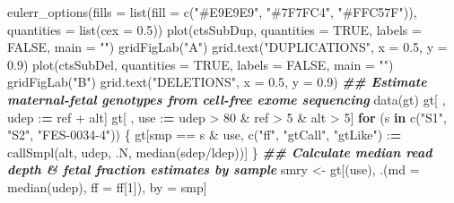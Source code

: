 \documentclass[11pt,letterpaper,oneside]{book}
\newenvironment{Shaded}{\begin{snugshade}}{\end{snugshade}}
\newcommand{\AttributeTok}[1]{\textcolor[rgb]{0.77,0.63,0.00}{#1}}
\newcommand{\ConstantTok}[1]{\textcolor[rgb]{0.00,0.00,0.00}{#1}}
\newcommand{\ControlFlowTok}[1]{\textcolor[rgb]{0.13,0.29,0.53}{\textbf{#1}}}
\newcommand{\DecValTok}[1]{\textcolor[rgb]{0.00,0.00,0.81}{#1}}
\newcommand{\DocumentationTok}[1]{\textcolor[rgb]{0.56,0.35,0.01}{\textbf{\textit{#1}}}}
\newcommand{\ErrorTok}[1]{\textcolor[rgb]{0.64,0.00,0.00}{\textbf{#1}}}
\newcommand{\FloatTok}[1]{\textcolor[rgb]{0.00,0.00,0.81}{#1}}
\newcommand{\FunctionTok}[1]{\textcolor[rgb]{0.00,0.00,0.00}{#1}}
\newcommand{\NormalTok}[1]{#1}
\newcommand{\OtherTok}[1]{\textcolor[rgb]{0.56,0.35,0.01}{#1}}
\newcommand{\SpecialCharTok}[1]{\textcolor[rgb]{0.00,0.00,0.00}{#1}}
\newcommand{\StringTok}[1]{\textcolor[rgb]{0.31,0.60,0.02}{#1}}
\begin{document}
\begin{Shaded}
\begin{Highlighting}[]
\FunctionTok{eulerr\_options}\NormalTok{(}\AttributeTok{fills =} \FunctionTok{list}\NormalTok{(}\AttributeTok{fill =} \FunctionTok{c}\NormalTok{(}\StringTok{"\#E9E9E9"}\NormalTok{, }\StringTok{"\#7F7FC4"}\NormalTok{, }\StringTok{"\#FFC57F"}\NormalTok{)),}
               \AttributeTok{quantities =} \FunctionTok{list}\NormalTok{(}\AttributeTok{cex =} \FloatTok{0.5}\NormalTok{))}
\FunctionTok{plot}\NormalTok{(ctsSubDup, }\AttributeTok{quantities =} \ConstantTok{TRUE}\NormalTok{, }\AttributeTok{labels =} \ConstantTok{FALSE}\NormalTok{, }\AttributeTok{main =} \StringTok{""}\NormalTok{)}
\FunctionTok{gridFigLab}\NormalTok{(}\StringTok{"A"}\NormalTok{)}
\FunctionTok{grid.text}\NormalTok{(}\StringTok{"DUPLICATIONS"}\NormalTok{, }\AttributeTok{x =} \FloatTok{0.5}\NormalTok{, }\AttributeTok{y =} \FloatTok{0.9}\NormalTok{)}
\FunctionTok{plot}\NormalTok{(ctsSubDel, }\AttributeTok{quantities =} \ConstantTok{TRUE}\NormalTok{, }\AttributeTok{labels =} \ConstantTok{FALSE}\NormalTok{, }\AttributeTok{main =} \StringTok{""}\NormalTok{)}
\FunctionTok{gridFigLab}\NormalTok{(}\StringTok{"B"}\NormalTok{)}
\FunctionTok{grid.text}\NormalTok{(}\StringTok{"DELETIONS"}\NormalTok{, }\AttributeTok{x =} \FloatTok{0.5}\NormalTok{, }\AttributeTok{y =} \FloatTok{0.9}\NormalTok{)}
\DocumentationTok{\#\# Estimate maternal{-}fetal genotypes from cell{-}free exome sequencing}
\FunctionTok{data}\NormalTok{(gt)}
\NormalTok{gt[ , udep }\SpecialCharTok{:}\ErrorTok{=}\NormalTok{ ref }\SpecialCharTok{+}\NormalTok{ alt]}
\NormalTok{gt[ , use }\SpecialCharTok{:}\ErrorTok{=}\NormalTok{ udep }\SpecialCharTok{\textgreater{}} \DecValTok{80} \SpecialCharTok{\&}\NormalTok{ ref }\SpecialCharTok{\textgreater{}} \DecValTok{5} \SpecialCharTok{\&}\NormalTok{ alt }\SpecialCharTok{\textgreater{}} \DecValTok{5}\NormalTok{]}
\ControlFlowTok{for}\NormalTok{ (s }\ControlFlowTok{in} \FunctionTok{c}\NormalTok{(}\StringTok{"S1"}\NormalTok{, }\StringTok{"S2"}\NormalTok{, }\StringTok{"FES{-}0034{-}4"}\NormalTok{)) \{}
\NormalTok{  gt[smp }\SpecialCharTok{==}\NormalTok{ s }\SpecialCharTok{\&}\NormalTok{ use,}
     \FunctionTok{c}\NormalTok{(}\StringTok{"ff"}\NormalTok{, }\StringTok{"gtCall"}\NormalTok{, }\StringTok{"gtLike"}\NormalTok{) }\SpecialCharTok{:}\ErrorTok{=} \FunctionTok{callSmpl}\NormalTok{(alt, udep, .N, }\FunctionTok{median}\NormalTok{(sdep}\SpecialCharTok{/}\NormalTok{ldep))]}
\NormalTok{\}}
\DocumentationTok{\#\# Calculate median read depth \& fetal fraction estimates by sample}
\NormalTok{smry }\OtherTok{\textless{}{-}}\NormalTok{ gt[(use), .(}\AttributeTok{md =} \FunctionTok{median}\NormalTok{(udep), }\AttributeTok{ff =}\NormalTok{ ff[}\DecValTok{1}\NormalTok{]), by }\OtherTok{=}\NormalTok{ smp]}

\end{Highlighting}
\end{Shaded}
\end{document}
